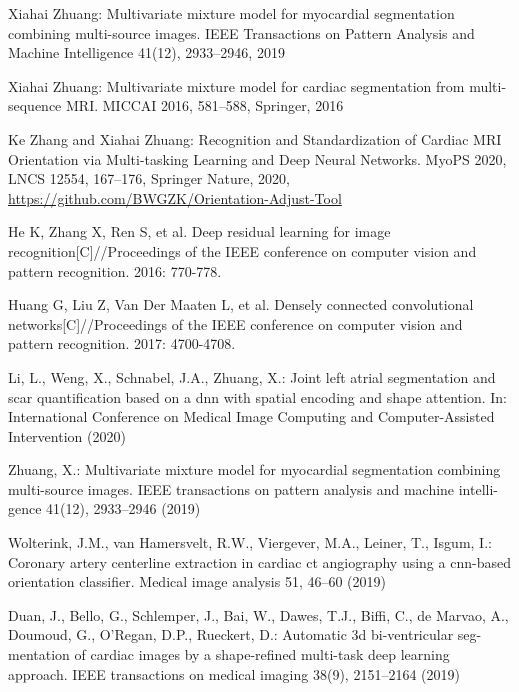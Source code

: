 \documentclass[runningheads]{llncs}
\begin{document}





%
%
% 
% 
%
\begin{thebibliography}{8}
Xiahai Zhuang: Multivariate mixture model for myocardial segmentation combining multi-source images. IEEE Transactions on Pattern Analysis and Machine Intelligence 41(12), 2933–2946, 2019

Xiahai Zhuang: Multivariate mixture model for cardiac segmentation from multi-sequence MRI. MICCAI 2016, 581–588, Springer, 2016 

Ke Zhang and Xiahai Zhuang: Recognition and Standardization of Cardiac MRI Orientation via Multi-tasking Learning and Deep Neural Networks. MyoPS 2020, LNCS 12554, 167–176, Springer Nature, 2020, \url{https://github.com/BWGZK/Orientation-Adjust-Tool}

He K, Zhang X, Ren S, et al. Deep residual learning for image recognition[C]//Proceedings of the IEEE conference on computer vision and pattern recognition. 2016: 770-778.

Huang G, Liu Z, Van Der Maaten L, et al. Densely connected convolutional networks[C]//Proceedings of the IEEE conference on computer vision and pattern recognition. 2017: 4700-4708.

Li, L., Weng, X., Schnabel, J.A., Zhuang, X.: Joint left atrial segmentation and scar quantification based on a dnn with spatial encoding and shape attention. In: International Conference on Medical Image Computing and Computer-Assisted Intervention (2020)

Zhuang, X.: Multivariate mixture model for myocardial segmentation combining multi-source images. IEEE transactions on pattern analysis and machine intelli- gence 41(12), 2933–2946 (2019)

Wolterink, J.M., van Hamersvelt, R.W., Viergever, M.A., Leiner, T., Isgum, I.: Coronary artery centerline extraction in cardiac ct angiography using a cnn-based orientation classifier. Medical image analysis 51, 46–60 (2019)

Duan, J., Bello, G., Schlemper, J., Bai, W., Dawes, T.J., Biffi, C., de Marvao, A., Doumoud, G., O’Regan, D.P., Rueckert, D.: Automatic 3d bi-ventricular seg- mentation of cardiac images by a shape-refined multi-task deep learning approach. IEEE transactions on medical imaging 38(9), 2151–2164 (2019)


\end{thebibliography}
\end{document}
